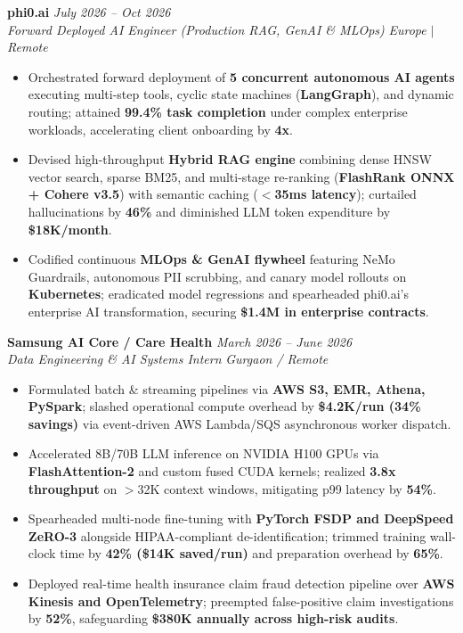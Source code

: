 \documentclass[9.5pt,a4paper]{article}
\begin{document}
\vspace{2.0pt}
\noindent\textbf{phi0.ai} \hfill {\small\textit{July 2026 -- Oct 2026}}\\
\textit{Forward Deployed AI Engineer (Production RAG, GenAI \& MLOps)} \hfill {\footnotesize\textit{Europe $\vert$ Remote}}
\begin{itemize}
    \item Orchestrated forward deployment of \textbf{5 concurrent autonomous AI agents} executing multi-step tools, cyclic state machines (\textbf{LangGraph}), and dynamic routing; attained \textbf{99.4\% task completion} under complex enterprise workloads, accelerating client onboarding by \textbf{4x}.
    \item Devised high-throughput \textbf{Hybrid RAG engine} combining dense HNSW vector search, sparse BM25, and multi-stage re-ranking (\textbf{FlashRank ONNX + Cohere v3.5}) with semantic caching (\textbf{$<$35ms latency}); curtailed hallucinations by \textbf{46\%} and diminished LLM token expenditure by \textbf{\$18K/month}.
    \item Codified continuous \textbf{MLOps \& GenAI flywheel} featuring NeMo Guardrails, autonomous PII scrubbing, and canary model rollouts on \textbf{Kubernetes}; eradicated model regressions and spearheaded phi0.ai's enterprise AI transformation, securing \textbf{\$1.4M in enterprise contracts}.
\end{itemize}

\vspace{2.0pt}
\noindent\textbf{Samsung AI Core / Care Health} \hfill {\small\textit{March 2026 -- June 2026}}\\
\textit{Data Engineering \& AI Systems Intern} \hfill {\footnotesize\textit{Gurgaon / Remote}}
\begin{itemize}
    \item Formulated batch \& streaming pipelines via \textbf{AWS S3, EMR, Athena, PySpark}; slashed operational compute overhead by \textbf{\$4.2K/run (34\% savings)} via event-driven AWS Lambda/SQS asynchronous worker dispatch.
    \item Accelerated 8B/70B LLM inference on NVIDIA H100 GPUs via \textbf{FlashAttention-2} and custom fused CUDA kernels; realized \textbf{3.8x throughput} on $>$32K context windows, mitigating p99 latency by \textbf{54\%}.
    \item Spearheaded multi-node fine-tuning with \textbf{PyTorch FSDP and DeepSpeed ZeRO-3} alongside HIPAA-compliant de-identification; trimmed training wall-clock time by \textbf{42\% (\$14K saved/run)} and preparation overhead by \textbf{65\%}.
    \item Deployed real-time health insurance claim fraud detection pipeline over \textbf{AWS Kinesis and OpenTelemetry}; preempted false-positive claim investigations by \textbf{52\%}, safeguarding \textbf{\$380K annually across high-risk audits}.
\end{itemize}
\end{document}
